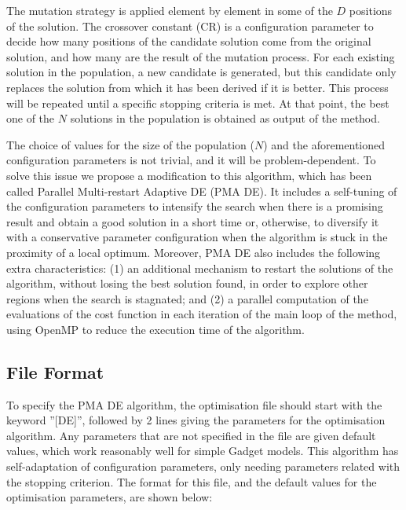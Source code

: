 \documentclass[10pt,twoside]{book}
\begin{document}
\bigskip

The mutation strategy is applied element by element in some of the $D$ positions of the solution.  The crossover constant (CR) is a configuration parameter to decide how many positions of the candidate solution come from the original solution, and how many are the result of the mutation process. For each existing solution in the population, a new candidate is generated, but this candidate only replaces the solution from which it has been derived if it is better.
This process will be repeated until a specific stopping criteria is met. At that point, the best one of the $N$ solutions in the population is obtained as output of the method.

\bigskip

The choice of values for the size of the population ($N$) and the aforementioned configuration parameters is not trivial, and it will be problem-dependent. To solve this issue we propose a modification to this algorithm, which has been called Parallel Multi-restart Adaptive DE (PMA DE). It includes a self-tuning of the configuration parameters to intensify the search when there is a promising result and obtain a good solution in a short time or, otherwise, to diversify it with a conservative parameter configuration when the algorithm is stuck in the proximity of a local optimum. Moreover, PMA DE also includes the following extra characteristics: (1) an additional mechanism to restart the solutions of the algorithm, without losing the best solution found, in order to explore other regions when the search is stagnated; and (2) a parallel computation of the evaluations of the cost function in each iteration of the main loop of the method, using OpenMP to reduce the execution time of the algorithm. 

\subsection{File Format}\label{subsec:defile}
To specify the PMA DE algorithm, the optimisation file should start with the keyword ''[DE]'', followed by 2 lines giving the parameters for the optimisation algorithm.  Any parameters that are not specified in the file are given default values, which work reasonably well for simple Gadget models.  This algorithm has self-adaptation of configuration parameters, only needing parameters related with the stopping criterion. The format for this file, and the default values for the optimisation parameters, are shown below:
\end{document}
